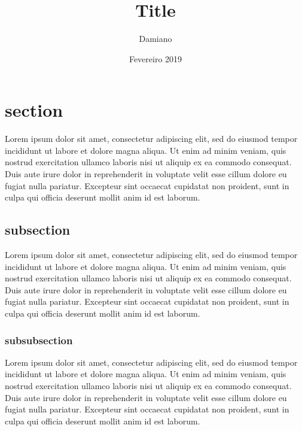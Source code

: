 \documentclass[12pt]{article}
\begin{document}
    \title{Title}
    \author{Damiano}
    \date{Fevereiro 2019}
    \maketitle
    \thispagestyle{empty}
    \newpage
    
    \setcounter{page}{1}
    \tableofcontents
    \newpage
    
    \listoffigures
    \newpage
    
    \listoftables
    \newpage
    
    \section{section}
    Lorem ipsum dolor sit amet, consectetur adipiscing elit, sed do eiusmod tempor incididunt ut labore et dolore magna aliqua. Ut enim ad minim veniam, quis nostrud exercitation ullamco laboris nisi ut aliquip ex ea commodo consequat. Duis aute irure dolor in reprehenderit in voluptate velit esse cillum dolore eu fugiat nulla pariatur. Excepteur sint occaecat cupidatat non proident, sunt in culpa qui officia deserunt mollit anim id est laborum.

    \subsection{subsection}
    Lorem ipsum dolor sit amet, consectetur adipiscing elit, sed do eiusmod tempor incididunt ut labore et dolore magna aliqua. Ut enim ad minim veniam, quis nostrud exercitation ullamco laboris nisi ut aliquip ex ea commodo consequat. Duis aute irure dolor in reprehenderit in voluptate velit esse cillum dolore eu fugiat nulla pariatur. Excepteur sint occaecat cupidatat non proident, sunt in culpa qui officia deserunt mollit anim id est laborum.
    
    \subsubsection{subsubsection}
    Lorem ipsum dolor sit amet, consectetur adipiscing elit, sed do eiusmod tempor incididunt ut labore et dolore magna aliqua. Ut enim ad minim veniam, quis nostrud exercitation ullamco laboris nisi ut aliquip ex ea commodo consequat. Duis aute irure dolor in reprehenderit in voluptate velit esse cillum dolore eu fugiat nulla pariatur. Excepteur sint occaecat cupidatat non proident, sunt in culpa qui officia deserunt mollit anim id est laborum.
    
\end{document}
